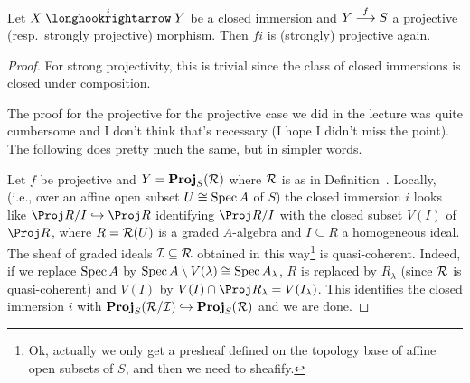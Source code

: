 \documentclass[a4paper,parskip=half,numbers=enddot, DIV=12]{scrreprt}
\begin{document}
\begin{prop}
	Let $X\monomorphism[i]Y$ be a closed immersion and $Y\morphism[f]S$ a projective (resp.\ strongly projective) morphism. Then $f i$ is (strongly) projective again.
\end{prop}
\begin{proof}
	For strong projectivity, this is trivial since the class of closed immersions is closed under composition. 
	
	The proof for the projective for the projective case we did in the lecture was quite cumbersome and I don't think that's necessary (I hope I didn't miss the point). The following does pretty much the same, but in simpler words.
	
	Let $f$ be projective and $Y=\operatorname{\mathbf{Proj}}_S(\mathcal{R})$ where $\mathcal{R}$ is as in Definition~. Locally, (i.e., over an affine open subset $U\cong \operatorname{Spec} A$ of $S$) the closed immersion $i$ looks like $\Proj R/I\monomorphism\Proj R$ identifying $\Proj R/I$ with the closed subset $V(I)$ of $\Proj R$, where $R=\mathcal{R}(U)$ is a graded $A$-algebra and $I\subseteq R$ a homogeneous ideal. The sheaf of graded ideals $\mathcal{I}\subseteq \mathcal{R}$ obtained in this way\footnote{Ok, actually we only get a presheaf defined on the topology base of affine open subsets of $S$, and then we need to sheafify.} is quasi-coherent. Indeed, if we replace $\operatorname{Spec} A$ by $\operatorname{Spec} A\setminus V(\lambda)\cong\operatorname{Spec} A_\lambda$, $R$ is replaced by $R_\lambda$ (since $\mathcal{R}$ is quasi-coherent) and $V(I)$ by $V(I)\cap\Proj R_\lambda=V(I_\lambda)$. This identifies the closed immersion $i$ with $\PROJ_S(\Rr/\Ii)\monomorphism\PROJ_S(\Rr)$ and we are done.

\end{proof}
\end{document}
